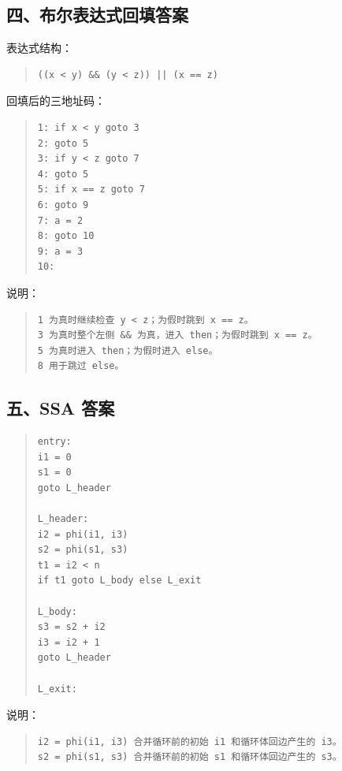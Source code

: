 \documentclass[UTF8,zihao=-4]{ctexart}
\begin{document}
\subsection*{四、布尔表达式回填答案}

表达式结构：

\begin{quote}
\footnotesize
\begin{verbatim}
((x < y) && (y < z)) || (x == z)
\end{verbatim}
\end{quote}

回填后的三地址码：

\begin{quote}
\footnotesize
\begin{verbatim}
1: if x < y goto 3
2: goto 5
3: if y < z goto 7
4: goto 5
5: if x == z goto 7
6: goto 9
7: a = 2
8: goto 10
9: a = 3
10:
\end{verbatim}
\end{quote}

说明：

\begin{quote}
\footnotesize
\begin{verbatim}
1 为真时继续检查 y < z；为假时跳到 x == z。
3 为真时整个左侧 && 为真，进入 then；为假时跳到 x == z。
5 为真时进入 then；为假时进入 else。
8 用于跳过 else。
\end{verbatim}
\end{quote}

\subsection*{五、SSA 答案}

\begin{quote}
\footnotesize
\begin{verbatim}
entry:
i1 = 0
s1 = 0
goto L_header

L_header:
i2 = phi(i1, i3)
s2 = phi(s1, s3)
t1 = i2 < n
if t1 goto L_body else L_exit

L_body:
s3 = s2 + i2
i3 = i2 + 1
goto L_header

L_exit:
\end{verbatim}
\end{quote}

说明：

\begin{quote}
\footnotesize
\begin{verbatim}
i2 = phi(i1, i3) 合并循环前的初始 i1 和循环体回边产生的 i3。
s2 = phi(s1, s3) 合并循环前的初始 s1 和循环体回边产生的 s3。
\end{verbatim}
\end{quote}
\end{document}
